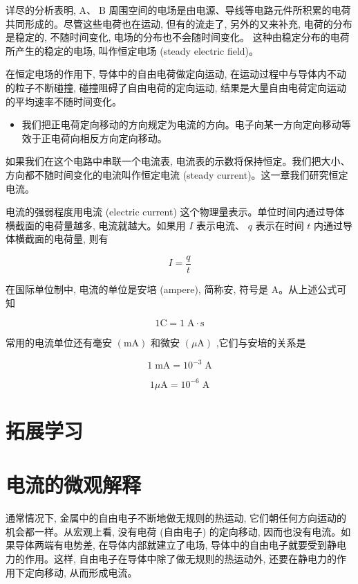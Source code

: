 \documentclass[10pt]{article}
\begin{document}
详尽的分析表明, \(\mathrm{A}\text{、}\mathrm{\;B}\) 周围空间的电场是由电源、导线等电路元件所积累的电荷共同形成的。尽管这些电荷也在运动, 但有的流走了, 另外的又来补充, 电荷的分布是稳定的, 不随时间变化, 电场的分布也不会随时间变化。 这种由稳定分布的电荷所产生的稳定的电场, 叫作恒定电场 (steady electric field)。

在恒定电场的作用下, 导体中的自由电荷做定向运动, 在运动过程中与导体内不动的粒子不断碰撞, 碰撞阻碍了自由电荷的定向运动, 结果是大量自由电荷定向运动的平均速率不随时间变化。

\begin{mdframed}

\begin{itemize}
\item 我们把正电荷定向移动的方向规定为电流的方向。电子向某一方向定向移动等效于正电荷向相反方向定向移动。
\end{itemize}

\end{mdframed}

如果我们在这个电路中串联一个电流表, 电流表的示数将保持恒定。我们把大小、方向都不随时间变化的电流叫作恒定电流 (steady current)。这一章我们研究恒定电流。

电流的强弱程度用电流 (electric current) 这个物理量表示。单位时间内通过导体横截面的电荷量越多, 电流就越大。如果用 \(I\) 表示电流、 \(q\) 表示在时间 \(t\) 内通过导体横截面的电荷量, 则有

\[
I = \frac{q}{t}
\]

在国际单位制中, 电流的单位是安培 (ampere), 简称安, 符号是 A。从上述公式可知

\[
1\mathrm{C} = 1\mathrm{\;A} \cdot \mathrm{s}
\]

常用的电流单位还有毫安 \(\left( \mathrm{{mA}}\right)\) 和微安 \(\left( {\mu \mathrm{A}}\right)\) ,它们与安培的关系是

\[
1\mathrm{\;{mA}} = {10}^{-3}\mathrm{\;A}
\]

\[
{1\mu }\mathrm{A} = {10}^{-6}\mathrm{\;A}
\]

\section*{拓展学习}

\section*{电流的微观解释}

通常情况下, 金属中的自由电子不断地做无规则的热运动, 它们朝任何方向运动的机会都一样。从宏观上看, 没有电荷 (自由电子) 的定向移动, 因而也没有电流。如果导体两端有电势差, 在导体内部就建立了电场, 导体中的自由电子就要受到静电力的作用。这样, 自由电子在导体中除了做无规则的热运动外, 还要在静电力的作用下定向移动, 从而形成电流。
\end{document}
